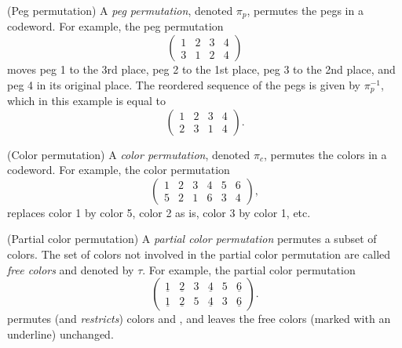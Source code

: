 \begin{definition}
(Peg permutation) A \emph{peg permutation}, denoted $\pi_p$, permutes the pegs in a codeword. For example, the peg permutation
\[
\begin{pmatrix}
1 & 2 & 3 & 4 \\
3 & 1 & 2 & 4
\end{pmatrix} 
\]
moves peg 1 to the 3rd place, peg 2 to the 1st place, peg 3 to the 2nd place, and peg 4 in its original place. The reordered sequence of the pegs is given by $\pi_p^{-1}$, which in this example is equal to
\[
\begin{pmatrix}
1 & 2 & 3 & 4 \\
2 & 3 & 1 & 4
\end{pmatrix} .
\]
\end{definition}

\begin{definition}
(Color permutation) A \emph{color permutation}, denoted $\pi_c$, permutes the colors in a codeword. For example, the color permutation
\[
\begin{pmatrix}
1 & 2 & 3 & 4 & 5 & 6 \\
5 & 2 & 1 & 6 & 3 & 4
\end{pmatrix} ,
\]
replaces color 1 by color 5, color 2 as is, color 3 by color 1, etc.
\end{definition}

\begin{definition}
(Partial color permutation) A \emph{partial color permutation} permutes a subset of colors. The set of colors not involved in the partial color permutation are called \emph{free colors} and denoted by $\tau$.
For example, the partial color permutation
\[
\begin{pmatrix}
\underline{1} & \underline{2} & 3 & \underline{4} & 5 & \underline{6} \\
\underline{1} & \underline{2} & 5 & \underline{4} & 3 & \underline{6} 
\end{pmatrix} .
\]
permutes (and \emph{restricts}) colors  and , and leaves the free colors (marked with an underline) unchanged.
\end{definition}

